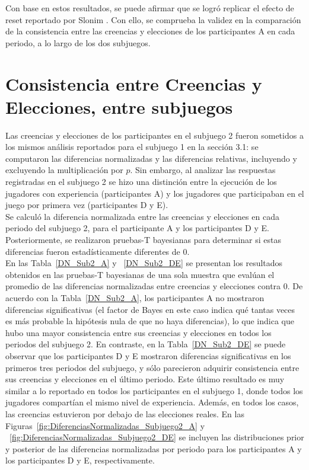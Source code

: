 Con base en estos resultados, se puede afirmar que se logró replicar el efecto de reset reportado por Slonim \parencite*{Slonim2005}. Con ello, se comprueba la validez en la comparación de la consistencia entre las creencias y elecciones de los participantes A en cada periodo, a lo largo de los dos subjuegos.\\

\section{Consistencia entre Creencias y Elecciones, entre subjuegos}

Las creencias y elecciones de los participantes en el subjuego 2 fueron sometidos a los mismos análisis reportados para el subjuego 1 en la sección 3.1: se computaron las diferencias normalizadas y las diferencias relativas, incluyendo y excluyendo la multiplicación por $p$. Sin embargo, al analizar las respuestas registradas en el subjuego 2 se hizo una distinción entre la ejecución de los jugadores con experiencia (participantes A) y los jugadores que participaban en el juego por primera vez (participantes D y E).\\

Se calculó la diferencia normalizada entre las creencias y elecciones en cada periodo del subjuego 2, para el participante A y los participantes D y E. Posteriormente,  se realizaron pruebas-T bayesianas para determinar si estas diferencias fueron estadísticamente diferentes de 0.\\

En las Tabla~\ref{DN_Sub2_A} y ~\ref{DN_Sub2_DE} se presentan los resultados obtenidos en las pruebas-T bayesianas de una sola muestra que evalúan el promedio de las diferencias normalizadas entre creencias y elecciones contra 0. De acuerdo con la Tabla~\ref{DN_Sub2_A}, los participantes A no mostraron diferencias significativas (el factor de Bayes en este caso indica qué tantas veces es más probable la hipótesis nula de que no haya diferencias), lo que indica que hubo una mayor consistencia entre sus creencias y elecciones en todos los periodos del subjuego 2. En contraste, en la Tabla~\ref{DN_Sub2_DE} se puede observar que los participantes D y E mostraron diferencias significativas en los primeros tres periodos del subjuego, y sólo parecieron  adquirir consistencia entre sus creencias y elecciones en el último periodo. Este último resultado es muy similar a lo reportado en todos los participantes en el subjuego 1, donde todos los jugadores compartían el mismo nivel de experiencia. Además, en todos los casos, las creencias estuvieron por debajo de las elecciones reales. En las Figuras~\ref{fig:DiferenciasNormalizadas_Subjuego2_A} y ~\ref{fig:DiferenciasNormalizadas_Subjuego2_DE} se incluyen las distribuciones prior y posterior de las diferencias normalizadas por periodo para los participantes A y los participantes D y E, respectivamente.\\

